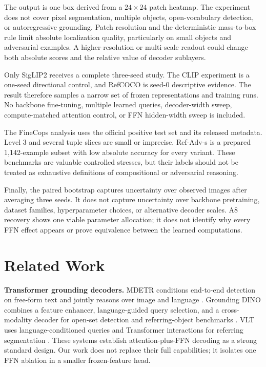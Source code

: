 \documentclass[10pt]{article}
\begin{document}
The output is one box derived from a $24\times24$ patch heatmap. The experiment
does not cover pixel segmentation, multiple objects, open-vocabulary detection,
or autoregressive grounding. Patch resolution and the deterministic mass-to-box
rule limit absolute localization quality, particularly on small objects and
adversarial examples. A higher-resolution or multi-scale readout could change
both absolute scores and the relative value of decoder sublayers.

Only SigLIP2 receives a complete three-seed study. The CLIP experiment is a
one-seed directional control, and RefCOCO is seed-0 descriptive evidence. The
result therefore samples a narrow set of frozen representations and training
runs. No backbone fine-tuning, multiple learned queries, decoder-width sweep,
compute-matched attention control, or FFN hidden-width sweep is included.

The FineCops analysis uses the official positive test set and its released
metadata. Level 3 and several tuple slices are small or imprecise. Ref-Adv-s is
a prepared 1,142-example subset with low absolute accuracy for every variant.
These benchmarks are valuable controlled stresses, but their labels should not
be treated as exhaustive definitions of compositional or adversarial reasoning.

Finally, the paired bootstrap captures uncertainty over observed images after
averaging three seeds. It does not capture uncertainty over backbone pretraining,
dataset families, hyperparameter choices, or alternative decoder scales. A8
recovery shows one viable parameter allocation; it does not identify why every
FFN effect appears or prove equivalence between the learned computations.

\section{Related Work}\label{related-work}

\textbf{Transformer grounding decoders.} MDETR conditions end-to-end detection
on free-form text and jointly reasons over image and language
\citep{kamath2021mdetr}. Grounding DINO combines a feature enhancer,
language-guided query selection, and a cross-modality decoder for open-set
detection and referring-object benchmarks \citep{liu2024groundingdino}. VLT
uses language-conditioned queries and Transformer interactions for referring
segmentation \citep{ding2021vlt}. These systems establish attention-plus-FFN
decoding as a strong standard design. Our work does not replace their full
capabilities; it isolates one FFN ablation in a smaller frozen-feature head.
\end{document}
